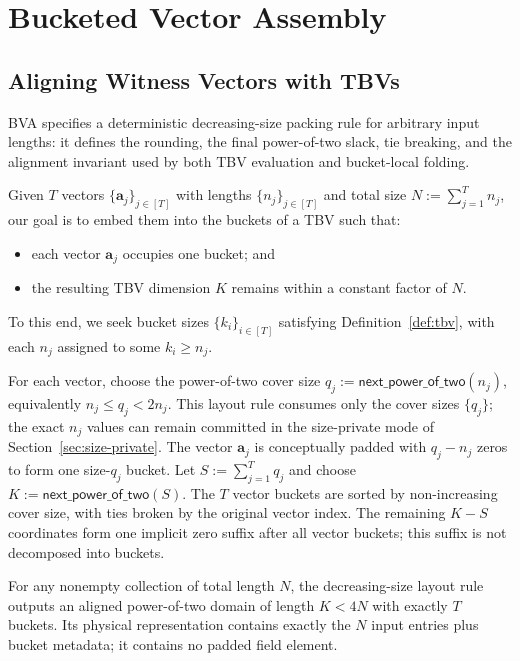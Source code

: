 

\section{Bucketed Vector Assembly}
\label{sec:bva}

\subsection{Aligning Witness Vectors with TBVs}
\label{sec:align}

BVA specifies a deterministic decreasing-size packing rule for arbitrary input
lengths: it defines the rounding, the final power-of-two slack, tie breaking,
and the alignment invariant used by both TBV evaluation and bucket-local
folding.

Given $T$ vectors $\{\bm{a}_j\}_{j\in[T]}$ with lengths
$\{n_j\}_{j\in[T]}$ and total size $N := \sum_{j=1}^T n_j$,
our goal is to embed them into the buckets of a TBV such that:
\begin{itemize}
    \item each vector $\bm{a}_j$ occupies one bucket; and
    \item the resulting TBV dimension $K$ remains within a constant factor of $N$.
\end{itemize}
To this end, we seek bucket sizes
$\{k_i\}_{i\in[T]}$ satisfying Definition~\ref{def:tbv},
with each $n_j$ assigned to some $k_i\ge n_j$.

For each vector, choose the power-of-two cover size
$q_j:=\mathsf{next\_power\_of\_two}(n_j)$, equivalently
$n_j\le q_j<2n_j$.  This layout rule consumes only the cover sizes
$\{q_j\}$; the exact $n_j$ values can remain committed in the size-private mode
of Section~\ref{sec:size-private}.
The vector $\bm{a}_j$ is conceptually padded with $q_j-n_j$ zeros to form one
size-$q_j$ bucket.  Let $S:=\sum_{j=1}^T q_j$ and choose
$K:=\mathsf{next\_power\_of\_two}(S)$.
The $T$ vector buckets are sorted by non-increasing cover size, with ties broken
by the original vector index.  The remaining $K-S$ coordinates form one
implicit zero suffix after all vector buckets; this suffix is not decomposed
into buckets.

\begin{proposition}
\label{prop:bvabound}
For any nonempty collection of total length $N$, the decreasing-size layout rule
outputs an aligned power-of-two domain of length $K<4N$ with
exactly $T$ buckets.  Its physical representation contains
exactly the $N$ input entries plus bucket metadata; it contains no padded field
element.
\end{proposition}

